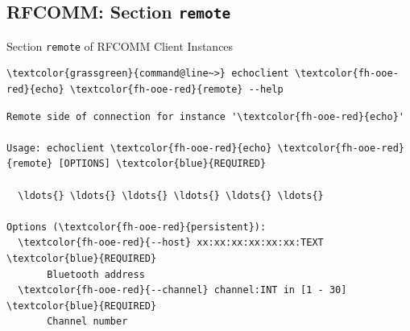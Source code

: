 \subsection{RFCOMM: Section \textcolor{fh-ooe-red}{\lstinline|remote|}}

\begin{frame}[fragile]{Section \alert{\lstinline|remote|} of RFCOMM Client Instances}

\begin{scriptsize}
\begin{Verbatim}[commandchars=\\\{\}]
\textcolor{grassgreen}{command@line~>} echoclient \textcolor{fh-ooe-red}{echo} \textcolor{fh-ooe-red}{remote} --help
\end{Verbatim}
\begin{Verbatim}[commandchars=\\\{\},frame=leftline,rulecolor=\color{fh-ooe-red}]
Remote side of connection for instance '\textcolor{fh-ooe-red}{echo}'

Usage: echoclient \textcolor{fh-ooe-red}{echo} \textcolor{fh-ooe-red}{remote} [OPTIONS] \textcolor{blue}{REQUIRED}

  \ldots{} \ldots{} \ldots{} \ldots{} \ldots{} \ldots{}

Options (\textcolor{fh-ooe-red}{persistent}):
  \textcolor{fh-ooe-red}{--host} xx:xx:xx:xx:xx:xx:TEXT \textcolor{blue}{REQUIRED}
       Bluetooth address
  \textcolor{fh-ooe-red}{--channel} channel:INT in [1 - 30] \textcolor{blue}{REQUIRED}
       Channel number
\end{Verbatim}
\end{scriptsize}
\end{frame}

